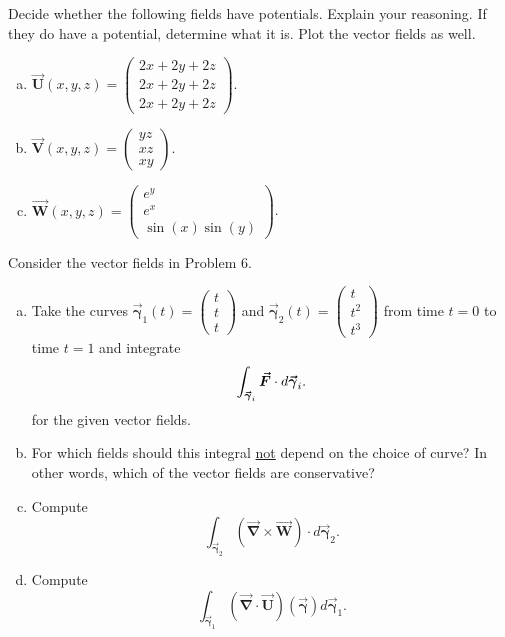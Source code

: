 \documentclass[12pt]{article} %
\newcommand{\vecfieldV}{\boldsymbol{\vec{V}}}
\newcommand{\vecfieldW}{\boldsymbol{\vec{W}}}
\newcommand{\vecfieldU}{\boldsymbol{\vec{U}}}
\newcommand{\curvegamma}{\boldsymbol{\vec{\gamma}}}
\newcommand{\grad}{\boldsymbol{\vec{\nabla}}}
\begin{document}
\newpage
\begin{problem}
    Decide whether the following fields have potentials.  Explain your reasoning. If they do have a potential, determine what it is. Plot the vector fields as well.
    \begin{enumerate}[(a)]
        \item $\vecfieldU(x,y,z) = \begin{pmatrix} 2x + 2y + 2z \\ 2x + 2y + 2z \\ 2x + 2y + 2z \end{pmatrix}$.
        \item $\vecfieldV(x,y,z) = \begin{pmatrix} yz \\ xz \\ xy \end{pmatrix}$.
        \item $\vecfieldW(x,y,z) = \begin{pmatrix} e^y \\ e^x \\ \sin(x)\sin(y) \end{pmatrix}$.
    \end{enumerate}
\end{problem}
\begin{solution}

\end{solution}

\newpage
\begin{problem}
    Consider the vector fields in Problem 6. 
\begin{enumerate}[(a)]
    \item Take the curves $\curvegamma_1(t) =\begin{pmatrix} t \\ t \\ t\end{pmatrix}$ and $\curvegamma_2(t)=\begin{pmatrix} t \\ t^2 \\ t^3 \end{pmatrix}$ from time $t=0$ to time $t=1$ and integrate
    \[
    \int_{\curvegamma_i} \forcevec \cdot d\curvegamma_i.
    \]
    for the given vector fields.

    \item For which fields should this integral \underline{not} depend on the choice of curve? In other words, which of the vector fields are conservative?
    \item Compute
    \[
    \int_{\curvegamma_2} (\grad \times \vecfieldW) \cdot d\curvegamma_2.
    \]
    \item Compute
    \[
    \int_{\curvegamma_1} (\grad \cdot \vecfieldU)(\curvegamma) d\curvegamma_1.
    \]
\end{enumerate}
\end{problem}
\begin{solution}

\end{solution}
\end{document}
